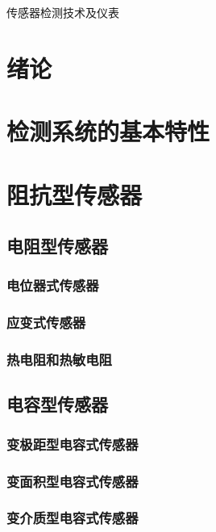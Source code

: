 \documentclass[11pt]{article}
\begin{document}
\color{fontcolor}{}
传感器检测技术及仪表
\tableofcontents
\section{绪论}

\section{检测系统的基本特性}

\section{阻抗型传感器}
\subsection{电阻型传感器}
\subsubsection{电位器式传感器}%
\label{ssub:dian_wei_qi_shi_chuan_gan_qi_}

\subsubsection{应变式传感器}%
\label{ssub:ying_bian_shi_chuan_gan_qi_}

\subsubsection{热电阻和热敏电阻}%
\label{ssub:re_dian_zu_he_re_min_dian_zu_}

\subsection{电容型传感器}
\subsubsection{变极距型电容式传感器}%
\label{ssub:bian_ji_ju_xing_dian_rong_shi_chuan_gan_qi_}

\subsubsection{变面积型电容式传感器}%
\label{ssub:bian_mian_ji_xing_dian_rong_shi_chuan_gan_qi_}

\subsubsection{变介质型电容式传感器}%
\label{ssub:bian_jie_zhi_xing_dian_rong_shi_chuan_gan_qi_}
\end{document}
